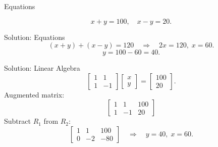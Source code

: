 \usetikzlibrary{arrows, positioning}




\begin{frame}{Equations}
\centering
{}
\[
x+y=100,\quad x-y=20.
\]
\end{frame}

\begin{frame}{Solution: Equations}
\[
(x+y)+(x-y)=120\quad\Rightarrow\quad 2x=120,\; x=60.
\]
\[
y=100-60=40.
\]
\end{frame}

\begin{frame}{Solution: Linear Algebra}
\[
\begin{bmatrix} 1 & 1\\ 1 & -1 \end{bmatrix}
\begin{bmatrix} x\\ y \end{bmatrix}=
\begin{bmatrix} 100\\ 20 \end{bmatrix}.
\]
Augmented matrix:
\[
\left[\begin{array}{cc|c}
1 & 1 & 100\\[1mm]
1 & -1 & 20
\end{array}\right]
\]
Subtract \(R_1\) from \(R_2\):
\[
\left[\begin{array}{cc|c}
1 & 1 & 100\\[1mm]
0 & -2 & -80
\end{array}\right]
\quad\Rightarrow\quad y=40,\; x=60.
\]
\end{frame}


